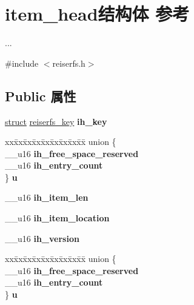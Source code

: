 \hypertarget{structitem__head}{}\section{item\+\_\+head结构体 参考}
\label{structitem__head}


...  




{\ttfamily \#include $<$reiserfs.\+h$>$}

\subsection*{Public 属性}
\begin{DoxyCompactItemize}
\item 
\mbox{\label{structitem__head_acfa02c91a5f6b7645cc9c0366eeb0956}} 
\hyperlink{interfacestruct}{struct} \hyperlink{structreiserfs__key}{reiserfs\+\_\+key} {\bfseries ih\+\_\+key}
\item 
\mbox{\label{structitem__head_a52e6b7f572d11086cdabe4e8a13d99ea}} 
\begin{tabbing}
xx\=xx\=xx\=xx\=xx\=xx\=xx\=xx\=xx\=\kill
union \{\\
\>\_\_u16 {\bfseries ih\_free\_space\_reserved}\\
\>\_\_u16 {\bfseries ih\_entry\_count}\\
\} {\bfseries u}\\

\end{tabbing}\item 
\mbox{\label{structitem__head_a73454cdfc490aafed4aef1dac0b377a0}} 
\+\_\+\+\_\+u16 {\bfseries ih\+\_\+item\+\_\+len}
\item 
\mbox{\label{structitem__head_a20feeb781064e41471947b946709efcc}} 
\+\_\+\+\_\+u16 {\bfseries ih\+\_\+item\+\_\+location}
\item 
\mbox{\label{structitem__head_a94fd86cbf69f8f85b0ef85722db2cff1}} 
\+\_\+\+\_\+u16 {\bfseries ih\+\_\+version}
\item 
\mbox{\label{structitem__head_a06a3eafbfd785d6e0ddef9cae0b96679}} 
\begin{tabbing}
xx\=xx\=xx\=xx\=xx\=xx\=xx\=xx\=xx\=\kill
union \{\\
\>\_\_u16 {\bfseries ih\_free\_space\_reserved}\\
\>\_\_u16 {\bfseries ih\_entry\_count}\\
\} {\bfseries u}\\

\end{tabbing}\end{DoxyCompactItemize}



